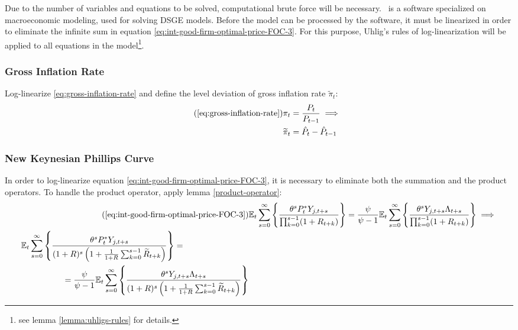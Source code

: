 \documentclass[
thesis.tex
]{subfiles}
\begin{document}
	Due to the number of variables and equations to be solved, computational brute force will be necessary. \dynare \ is a software specialized on macroeconomic modeling, used for solving DSGE models. Before the model can be processed by the software, it must be linearized in order to eliminate the infinite sum in equation \ref{eq:int-good-firm-optimal-price-FOC-3}. For this purpose, Uhlig's rules of log-linearization \cite{uhlig_toolkit_1999} will be applied to all equations in the model\footnote{see lemma \ref{lemma:uhligs-rules} for details.}.
	
	
	\subsubsection*{Gross Inflation Rate}
	
	Log-linearize \ref{eq:gross-inflation-rate} and define the level deviation of gross inflation rate $\widetilde{\pi}_t$:
	\begin{align}
		\tag{\ref{eq:gross-inflation-rate}}
		\pi_t &= \frac{P_t}{P_{t-1}} \implies \\
		\widetilde{\pi}_t &= \hat{P}_t - \hat{P}_{t-1}
		\label{eq:level-dev-gross-inflation-rate}
	\end{align}
	
	
	\subsubsection*{New Keynesian Phillips Curve}
	
	In order to log-linearize equation \ref{eq:int-good-firm-optimal-price-FOC-3}, it is necessary to eliminate both the summation and the product operators. To handle the product operator, apply lemma \ref{product-operator}:
	\begin{align}
		\tag{\ref{eq:int-good-firm-optimal-price-FOC-3}}
		& \E \sum_{s=0}^{\infty} \left\{ \frac{\theta^s P_t^\ast Y_{j,t+s} }{ \prod_{k=0}^{s-1}(1+R_{t+k})} \right\} = \frac{\psi}{\psi-1} \E \sum_{s=0}^{\infty} \left\{ \frac{\theta^s Y_{j,t+s} \Lambda_{t+s}}{\prod_{k=0}^{s-1}(1+R_{t+k})} \right\} \implies
		\\
		\begin{split}
			& \E \sum_{s=0}^{\infty} \left\{ \frac{\theta^s P_t^\ast Y_{j,t+s}}{ (1 + R)^s \left( 1 + \frac{1}{1 + R} \sum_{k=0}^{s-1} \widetilde{R}_{t+k} \right) } \right\} = 
			\\ & \quad \quad \quad \quad \quad = \frac{\psi}{\psi-1} \E \sum_{s=0}^{\infty} \left\{ \frac{\theta^s Y_{j,t+s} \Lambda_{t+s}}{ (1 + R)^s \left( 1 + \frac{1}{1 + R} \sum_{k=0}^{s-1} \widetilde{R}_{t+k} \right) } \right\} \label{eq:ll-optimal-price}
		\end{split}
	\end{align}
	
\end{document}
